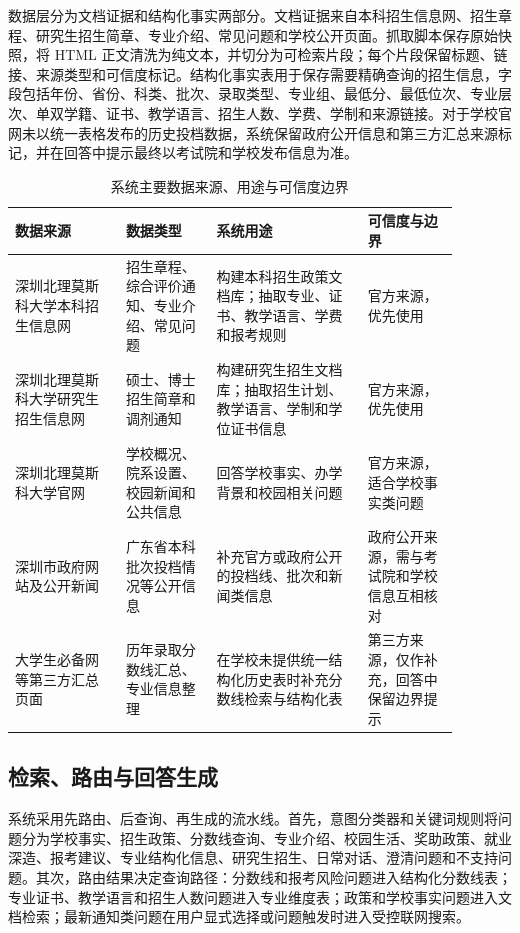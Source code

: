 \documentclass[UTF8,a4paper,11pt]{ctexart}
\begin{document}
数据层分为文档证据和结构化事实两部分。文档证据来自本科招生信息网、招生章程、研究生招生简章、专业介绍、常见问题和学校公开页面。抓取脚本保存原始快照，将 HTML 正文清洗为纯文本，并切分为可检索片段；每个片段保留标题、链接、来源类型和可信度标记。结构化事实表用于保存需要精确查询的招生信息，字段包括年份、省份、科类、批次、录取类型、专业组、最低分、最低位次、专业层次、单双学籍、证书、教学语言、招生人数、学费、学制和来源链接。对于学校官网未以统一表格发布的历史投档数据，系统保留政府公开信息和第三方汇总来源标记，并在回答中提示最终以考试院和学校发布信息为准。

\begin{table}[htbp]
\centering
\caption{系统主要数据来源、用途与可信度边界}
{\small
\setlength{\tabcolsep}{4pt}
\begin{tabular}{p{0.22\linewidth} p{0.18\linewidth} p{0.30\linewidth} p{0.18\linewidth}}
\toprule
数据来源 & 数据类型 & 系统用途 & 可信度与边界 \\
\midrule
深圳北理莫斯科大学本科招生信息网 & 招生章程、综合评价通知、专业介绍、常见问题 & 构建本科招生政策文档库；抽取专业、证书、教学语言、学费和报考规则 & 官方来源，优先使用 \\
深圳北理莫斯科大学研究生招生信息网 & 硕士、博士招生简章和调剂通知 & 构建研究生招生文档库；抽取招生计划、教学语言、学制和学位证书信息 & 官方来源，优先使用 \\
深圳北理莫斯科大学官网 & 学校概况、院系设置、校园新闻和公共信息 & 回答学校事实、办学背景和校园相关问题 & 官方来源，适合学校事实类问题 \\
深圳市政府网站及公开新闻 & 广东省本科批次投档情况等公开信息 & 补充官方或政府公开的投档线、批次和新闻类信息 & 政府公开来源，需与考试院和学校信息互相核对 \\
大学生必备网等第三方汇总页面 & 历年录取分数线汇总、专业信息整理 & 在学校未提供统一结构化历史表时补充分数线检索与结构化表 & 第三方来源，仅作补充，回答中保留边界提示 \\
\bottomrule
\end{tabular}
}
\end{table}

\subsection{检索、路由与回答生成}

系统采用先路由、后查询、再生成的流水线。首先，意图分类器和关键词规则将问题分为学校事实、招生政策、分数线查询、专业介绍、校园生活、奖助政策、就业深造、报考建议、专业结构化信息、研究生招生、日常对话、澄清问题和不支持问题。其次，路由结果决定查询路径：分数线和报考风险问题进入结构化分数线表；专业证书、教学语言和招生人数问题进入专业维度表；政策和学校事实问题进入文档检索；最新通知类问题在用户显式选择或问题触发时进入受控联网搜索。
\end{document}
